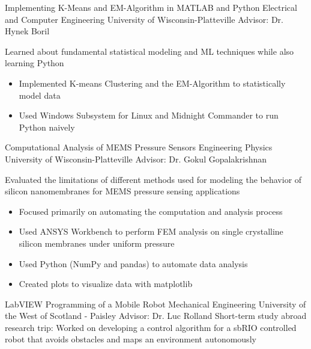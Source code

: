 {Implementing K-Means and EM-Algorithm in MATLAB and Python}
{Electrical and Computer Engineering}
{University of Wisconsin-Platteville}
{Advisor: Dr. Hynek Boril}
{Learned about fundamental statistical modeling and ML techniques while also learning Python
\begin{itemize}
    \item Implemented K-means Clustering and the EM-Algorithm to statistically model data
    \item Used Windows Subsystem for Linux and Midnight Commander to run Python naively
\end{itemize}
}

{Computational Analysis of MEMS Pressure Sensors}
{Engineering Physics}
{University of Wisconsin-Platteville}
{Advisor: Dr. Gokul Gopalakrishnan}
{Evaluated the limitations of different methods used for modeling the behavior of silicon nanomembranes for MEMS pressure sensing applications
\begin{itemize}
    \item Focused primarily on automating the computation and analysis process
    \item Used ANSYS Workbench to perform FEM analysis on single crystalline silicon membranes under uniform pressure
    \item Used Python (NumPy and pandas) to automate data analysis
    \item Created plots to visualize data with matplotlib
\end{itemize}
}

{LabVIEW Programming of a Mobile Robot}
{Mechanical Engineering}
{University of the West of Scotland - Paisley}
{Advisor: Dr. Luc Rolland}
{Short-term study abroad research trip: Worked on developing a control algorithm for a sbRIO controlled robot that avoids obstacles and maps an environment autonomously}